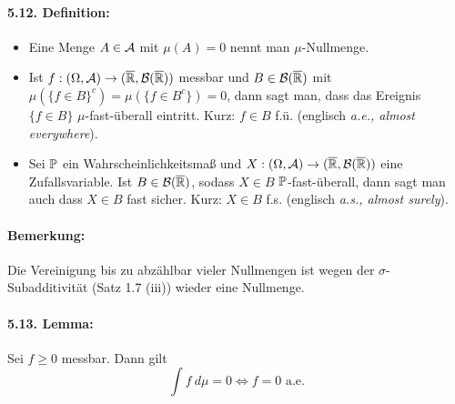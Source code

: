 \documentclass[12pt]{report}
\begin{document}
  \paragraph{5.12. Definition:}
  \begin{itemize}
      \item Eine Menge $A\in\mathcal{A}$ mit $\mu(A)=0$ nennt man $\mu$-Nullmenge.
      \item Ist $f:(\Omega,\mathcal{A})\to(\overline{\mathbb{R}},\mathcal{B}(\overline{\mathbb{R}}))$ messbar und $B\in\mathcal{B}(\overline{\mathbb{R}})$ mit $\mu\left(\{f\in B\}^c\right)=\mu(\{f\in B^c\})=0$, dann sagt man, dass das Ereignis $\{f\in B\}$ $\mu$-fast-\"uberall eintritt. Kurz: $f\in B$ f.\"u. (englisch \textit{a.e., almost everywhere}).
      \item Sei $\mathbb{P}$ ein Wahrscheinlichkeitsma\ss{} und $X:(\Omega,\mathcal{A})\to(\overline{\mathbb{R}},\mathcal{B}(\overline{\mathbb{R}}))$ eine Zufallsvariable. Ist $B\in\mathcal{B}(\overline{\mathbb{R}})$, sodass $X\in B$ $\mathbb{P}$-fast-\"uberall, dann sagt man auch dass $X\in B$ fast sicher. Kurz: $X\in B$ f.s. (englisch \textit{a.s., almost surely}).
  \end{itemize}
  
  \paragraph{Bemerkung:}Die Vereinigung bis zu abz\"ahlbar vieler Nullmengen ist wegen der $\sigma$-Subadditivit\"at (Satz 1.7 (iii)) wieder eine Nullmenge. 
  
  \paragraph{5.13. Lemma:}Sei $f\geq0$ messbar. Dann gilt
  $$\int f \ d\mu=0\iff f = 0\text{ a.e.}$$
  
\end{document}

